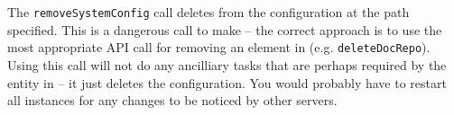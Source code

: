 The \verb+removeSystemConfig+ call deletes from \Rapture the configuration at the path specified. This is a dangerous call to make -- the
correct approach is to use the most appropriate API call for removing an element in \Rapture (e.g. \verb+deleteDocRepo+). Using this call will
not do any ancilliary tasks that are perhaps required by the entity in \Rapture -- it just deletes the configuration. You would probably have to
restart all \Rapture instances for any changes to be noticed by other servers.
